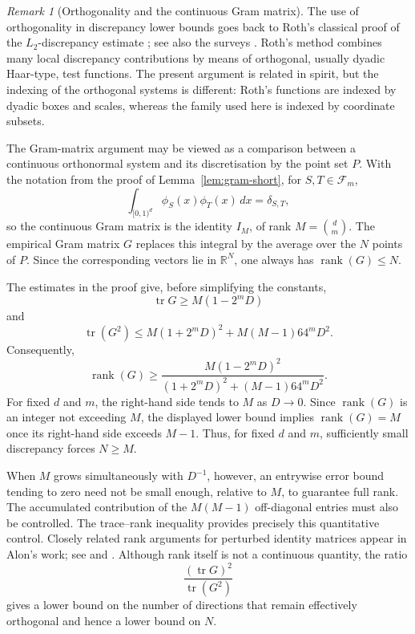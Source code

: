 \documentclass[11pt]{article}
\theoremstyle{plain}
\theoremstyle{remark}
\newtheorem{remark}[theorem]{Remark}
\theoremstyle{definition}
\newcommand{\1}{\mathbf{1}}
\newcommand{\tr}{\operatorname{tr}}
\newcommand{\rank}{\operatorname{rank}}
\begin{document}
\begin{remark}[Orthogonality and the continuous Gram matrix]
\label{rem:continuous-gram}
The use of orthogonality in discrepancy lower bounds goes back to
Roth's classical proof of the \(L_2\)-discrepancy estimate
\cite{Roth54}; see also the surveys \cite{Bil11,Bil14}. Roth's method combines many local discrepancy contributions by means
of orthogonal, usually dyadic Haar-type, test functions.  The present
argument is related in spirit, but the indexing of the orthogonal
systems is different: Roth's functions are indexed by dyadic boxes
and scales, whereas the family used here is indexed by coordinate
subsets.

The Gram-matrix argument may be viewed as a comparison between a
continuous orthonormal system and its discretisation by the point set
\(P\). With the notation from the proof of Lemma~\ref{lem:gram-short}, for \(S,T\in\mathcal F_m\),
\[
 \int_{[0,1)^d}\phi_S(x)\phi_T(x)\,dx=\delta_{S,T},
\]
so the continuous Gram matrix is the identity \(I_M\), of rank
\(M=\binom dm\).  The empirical Gram matrix \(G\) replaces this
integral by the average over the \(N\) points of \(P\).  Since the
corresponding vectors lie in \(\mathbb R^N\), one always has
\(\rank(G)\le N\).

The estimates in the proof give, before simplifying the constants,
\[
 \tr G\ge M(1-2^mD)
\]
and
\[
 \tr(G^2)
 \le
 M(1+2^mD)^2+M(M-1)64^mD^2.
\]
Consequently,
\[
 \rank(G)
 \ge
 \frac{
 M(1-2^mD)^2
 }{
 (1+2^mD)^2+(M-1)64^mD^2
 }.
\]
For fixed \(d\) and \(m\), the right-hand side tends to \(M\) as
\(D\to0\).  Since \(\rank(G)\) is an integer not exceeding \(M\), the displayed
lower bound implies \(\rank(G)=M\) once its right-hand side exceeds
\(M-1\).  Thus, for fixed \(d\) and \(m\), sufficiently small
discrepancy forces \(N\ge M\).

When \(M\) grows simultaneously with \(D^{-1}\), however, an entrywise
error bound tending to zero need not be small enough, relative to \(M\),
to guarantee full rank.  The accumulated contribution of the
\(M(M-1)\) off-diagonal entries must also be controlled.  The
trace--rank inequality provides precisely this quantitative control.
Closely related rank arguments for perturbed identity matrices appear
in Alon's work; see \cite[Lemma~2.2, p.~4]{Alon09} and
\cite[Theorem~8.1 and the following discussion, p.~13]{Alon09}.
Although rank itself is not a continuous quantity, the ratio
\[
 \frac{(\tr G)^2}{\tr(G^2)}
\]
gives a lower bound on the number of directions that remain effectively
orthogonal and hence a lower bound on \(N\).
\end{remark}
\end{document}
